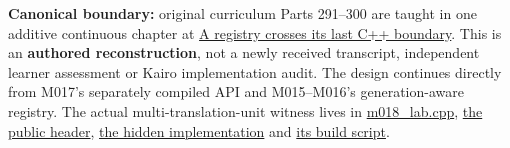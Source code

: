 \textbf{Canonical boundary:} original curriculum Parts 291--300 are taught in one additive continuous chapter at \href{Continuous\%20Notes/Computing\%20Foundations\%20-\%20From\%20Bits\%20to\%20C++\%20and\%20Systems\%20APIs\#A\%20registry\%20crosses\%20its\%20last\%20C++\%20boundary:\%20hidden\%20implementation,\%20typed\%20identity\%20and\%20measured\%20abstraction\%20cost}{A registry crosses its last C++ boundary}. This is an \textbf{authored reconstruction}, not a newly received transcript, independent learner assessment or Kairo implementation audit. The design continues directly from M017's separately compiled API and M015--M016's generation-aware registry. The actual multi-translation-unit witness lives in \href{tools/m018/m018_lab.cpp}{m018\_lab.cpp}, \href{tools/m018/asset_catalog.hpp}{the public header}, \href{tools/m018/asset_catalog.cpp}{the hidden implementation} and \href{tools/m018/build_m018_lab.sh}{its build script}.

